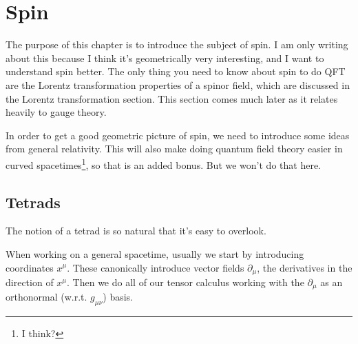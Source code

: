 \documentclass[main.tex]{subfiles}
\begin{document}
\chapter{Spin}

The purpose of this chapter is to introduce the subject of spin. I am only writing about this because I think it's geometrically very interesting, and I want to understand spin better. The only thing you need to know about spin to do QFT are the Lorentz transformation properties of a spinor field, which are discussed in the Lorentz transformation section. This section comes much later as it relates heavily to gauge theory.

In order to get a good geometric picture of spin, we need to introduce some ideas from general relativity. This will also make doing quantum field theory easier in curved spacetimes\footnote{I think?}, so that is an added bonus. But we won't do that here. 

\section{Tetrads}
The notion of a tetrad is so natural that it's easy to overlook.

When working on a general spacetime, usually we start by introducing coordinates $x^\mu$. These canonically introduce vector fields $\partial_\mu$, the derivatives in the direction of $x^\mu$. Then we do all of our tensor calculus working with the $\partial_\mu$ as an orthonormal (w.r.t. $g_{\mu \nu}$) basis. 
\end{document}
